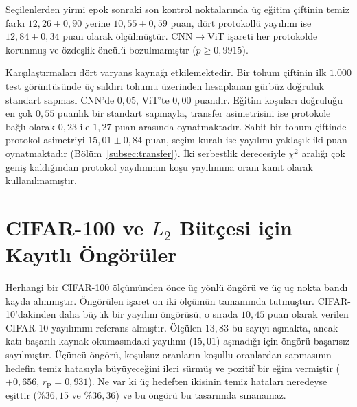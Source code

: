 Seçilenlerden yirmi epok sonraki son kontrol noktalarında üç eğitim çiftinin temiz farkı $12{,}26\pm0{,}90$ yerine $10{,}55\pm0{,}59$ puan, dört protokollü yayılımı ise $12{,}84\pm0{,}34$ puan olarak ölçülmüştür. CNN$\rightarrow$ViT işareti her protokolde korunmuş ve özdeşlik öncülü bozulmamıştır ($p \geq 0{,}9915$).

Karşılaştırmaları dört varyans kaynağı etkilemektedir. Bir tohum çiftinin ilk $1.000$ test görüntüsünde üç saldırı tohumu üzerinden hesaplanan gürbüz doğruluk standart sapması CNN'de $0{,}05$, ViT'te $0{,}00$ puandır. Eğitim koşuları doğruluğu en çok $0{,}55$ puanlık bir standart sapmayla, transfer asimetrisini ise protokole bağlı olarak $0{,}23$ ile $1{,}27$ puan arasında oynatmaktadır. Sabit bir tohum çiftinde protokol asimetriyi $15{,}01\pm0{,}84$ puan, seçim kuralı ise yayılımı yaklaşık iki puan oynatmaktadır (Bölüm~\ref{subsec:transfer}). İki serbestlik derecesiyle $\chi^2$ aralığı çok geniş kaldığından protokol yayılımının koşu yayılımına oranı kanıt olarak kullanılmamıştır.

\section{CIFAR-100 ve \texorpdfstring{$L_2$}{L2} Bütçesi için Kayıtlı Öngörüler}
\label{app:registrations}

Herhangi bir CIFAR-100 ölçümünden önce üç yönlü öngörü ve üç uç nokta bandı kayda alınmıştır. Öngörülen işaret on iki ölçümün tamamında tutmuştur. CIFAR-10'dakinden daha büyük bir yayılım öngörüsü, o sırada $10{,}45$ puan olarak verilen CIFAR-10 yayılımını referans almıştır. Ölçülen $13{,}83$ bu sayıyı aşmakta, ancak katı başarılı kaynak okumasındaki yayılımı ($15{,}01$) aşmadığı için öngörü başarısız sayılmıştır. Üçüncü öngörü, koşulsuz oranların koşullu oranlardan sapmasının hedefin temiz hatasıyla büyüyeceğini ileri sürmüş ve pozitif bir eğim vermiştir ($+0{,}656$, $r_{\mathrm{P}} = 0{,}931$). Ne var ki üç hedeften ikisinin temiz hataları neredeyse eşittir ($\%36{,}15$ ve $\%36{,}36$) ve bu öngörü bu tasarımda sınanamaz.

